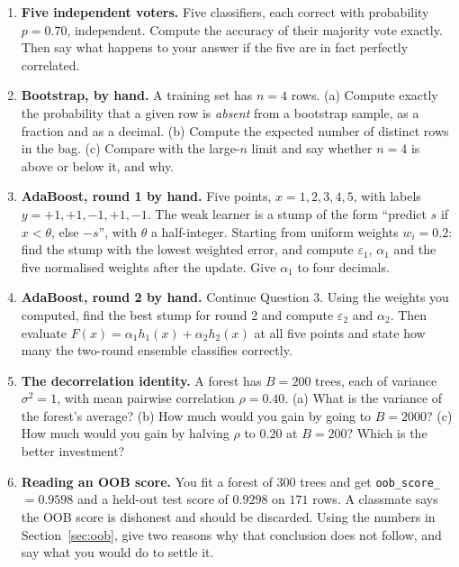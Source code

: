 \documentclass[11pt]{article}
\begin{document}
\begin{enumerate}[leftmargin=*]
  \item \textbf{Five independent voters.} Five classifiers, each correct with
    probability $p = 0.70$, independent. Compute the accuracy of their
    majority vote exactly. Then say what happens to your answer if the five
    are in fact perfectly correlated.

  \item \textbf{Bootstrap, by hand.} A training set has $n = 4$ rows. (a)
    Compute exactly the probability that a given row is \emph{absent} from a
    bootstrap sample, as a fraction and as a decimal. (b) Compute the expected
    number of distinct rows in the bag. (c) Compare with the large-$n$ limit
    and say whether $n = 4$ is above or below it, and why.

  \item \textbf{AdaBoost, round 1 by hand.} Five points, $x = 1,2,3,4,5$, with
    labels $y = +1, +1, -1, +1, -1$. The weak learner is a stump of the form
    ``predict $s$ if $x < \theta$, else $-s$'', with $\theta$ a half-integer.
    Starting from uniform weights $w_i = 0.2$: find the stump with the lowest
    weighted error, and compute $\varepsilon_1$, $\alpha_1$ and the five
    normalised weights after the update. Give $\alpha_1$ to four decimals.

  \item \textbf{AdaBoost, round 2 by hand.} Continue Question 3. Using the
    weights you computed, find the best stump for round 2 and compute
    $\varepsilon_2$ and $\alpha_2$. Then evaluate
    $F(x) = \alpha_1 h_1(x) + \alpha_2 h_2(x)$ at all five points and state how
    many the two-round ensemble classifies correctly.

  \item \textbf{The decorrelation identity.} A forest has $B = 200$ trees,
    each of variance $\sigma^2 = 1$, with mean pairwise correlation
    $\rho = 0.40$. (a) What is the variance of the forest's average? (b) How
    much would you gain by going to $B = 2000$? (c) How much would you gain by
    halving $\rho$ to $0.20$ at $B = 200$? Which is the better investment?

  \item \textbf{Reading an OOB score.} You fit a forest of $300$ trees and get
    \texttt{oob\_score\_} $= 0.9598$ and a held-out test score of $0.9298$ on
    $171$ rows. A classmate says the OOB score is dishonest and should be
    discarded. Using the numbers in Section~\ref{sec:oob}, give two reasons
    why that conclusion does not follow, and say what you would do to settle
    it.


\end{enumerate}
\end{document}
